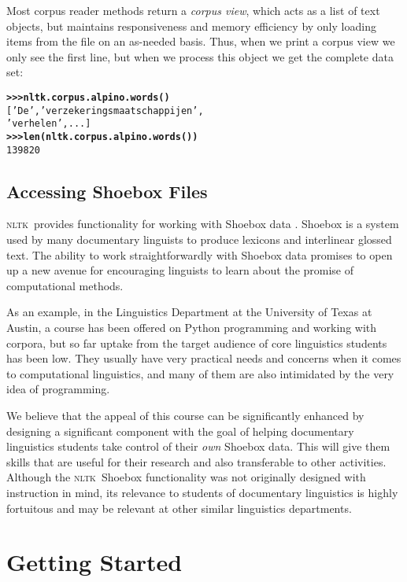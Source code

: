 \documentclass[11pt]{article}
\newcommand{\NLTK}{\textsc{nltk}}
\begin{document}
Most corpus reader methods return a \emph{corpus view}, which acts as
a list of text objects, but maintains responsiveness and memory
efficiency by only loading items from the file on an as-needed basis.
Thus, when we print a corpus view we only see the first line, but when
we process this object we get the complete data set:

{\footnotesize
\begin{alltt}
\textbf{>>> nltk.corpus.alpino.words()}
['De', 'verzekeringsmaatschappijen',
'verhelen', ...]
\textbf{>>> len(nltk.corpus.alpino.words())}
139820
\end{alltt}}

\subsection{Accessing Shoebox Files}

\NLTK\ provides functionality for working with Shoebox data
\cite{Robinson07}. Shoebox is a system used by many
documentary linguists to produce lexicons and interlinear glossed text.  The
ability to work straightforwardly with Shoebox data promises to open
up a new avenue for encouraging linguists to learn about the promise
of computational methods. 

As an example, in the Linguistics Department at the University of
Texas at Austin, a course has been offered on Python programming and
working with corpora, but so far uptake from the
target audience of core linguistics students has been low. They usually have very
practical needs and concerns when it comes to computational
linguistics, and many of them are also intimidated by the very idea of
programming. %

We believe that the appeal of this course can be significantly
enhanced by designing a significant component
with the goal of helping documentary linguistics students take control of their
\emph{own} Shoebox data. This will give them  skills that are
useful for their research and also transferable to other activities.
Although the \NLTK\ Shoebox functionality was not
originally designed with instruction in mind, its relevance to
students of documentary linguistics is highly fortuitous and
may be relevant at other similar linguistics departments.

\section{Getting Started}
\label{sec:getting-started}
\end{document}
